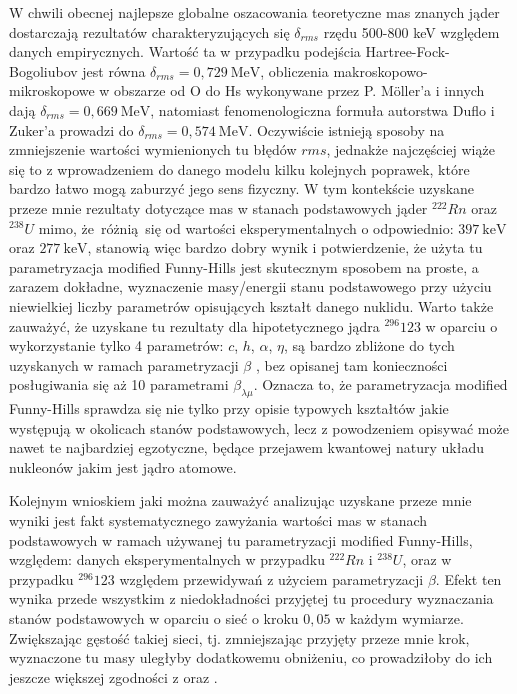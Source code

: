 \documentclass[a4paper,polish,twoside]{article}
\numberwithin{equation}{section}
\begin{document}
W chwili obecnej najlepsze globalne oszacowania teoretyczne mas znanych jąder dostarczają rezultatów charakteryzujących się $\delta_{rms}$ rzędu 500-800 keV względem danych empirycznych. Wartość ta w przypadku podejścia Hartree-Fock-Bogoliubov \cite{Gor1,Gor2} jest równa $\delta_{rms}=0,729~\mathrm{MeV}$, obliczenia makroskopowo-mikroskopowe w obszarze od O do Hs wykonywane przez P. M\"oller'a i innych \cite{Moll2009} dają  $\delta_{rms}=0,669~\mathrm{MeV}$, natomiast fenomenologiczna formuła autorstwa Duflo i Zuker'a \cite{Duflo} prowadzi do $\delta_{rms}=0,574~\mathrm{MeV}$. Oczywiście istnieją sposoby na zmniejszenie wartości wymienionych tu błędów $rms$, jednakże najczęściej wiąże się to z wprowadzeniem do danego modelu kilku kolejnych poprawek, które bardzo łatwo mogą zaburzyć jego sens fizyczny. W tym kontekście uzyskane przeze mnie rezultaty dotyczące mas w stanach podstawowych jąder $^{222}Rn$ oraz $^{238}U$ mimo, \mbox{że różnią się} od wartości eksperymentalnych o odpowiednio: $397~\mathrm{keV}$ oraz $277~\mathrm{keV}$, stanowią więc bardzo dobry wynik i potwierdzenie, że użyta tu parametryzacja modified Funny-Hills jest skutecznym sposobem na proste, a zarazem dokładne, wyznaczenie masy/energii stanu podstawowego przy użyciu niewielkiej liczby parametrów opisujących kształt danego nuklidu. Warto także zauważyć, że uzyskane tu rezultaty dla hipotetycznego jądra  $^{296}123$ w oparciu o wykorzystanie tylko 4 parametrów: $c$, $h$, $\alpha$, $\eta$, są bardzo zbliżone do tych uzyskanych w ramach parametryzacji $\beta$ \cite{A32}, bez opisanej tam konieczności posługiwania się aż 10 parametrami $\beta_{\lambda \mu}$. Oznacza to, że parametryzacja modified Funny-Hills sprawdza się nie tylko przy opisie typowych kształtów jakie występują w okolicach stanów podstawowych, lecz z powodzeniem opisywać może nawet te najbardziej egzotyczne, będące przejawem kwantowej natury układu nukleonów jakim jest jądro atomowe.

Kolejnym wnioskiem jaki można zauważyć analizując uzyskane przeze mnie wyniki jest fakt systematycznego zawyżania wartości mas w stanach podstawowych w ramach używanej tu parametryzacji modified Funny-Hills, względem: danych eksperymentalnych w przypadku $^{222}Rn$ i $^{238}U$, oraz w przypadku $^{296}123$ względem przewidywań z użyciem parametryzacji $\beta$. Efekt ten wynika przede wszystkim z niedokładności przyjętej tu procedury wyznaczania stanów podstawowych w oparciu o sieć o kroku $0,05$ w każdym wymiarze. Zwiększając gęstość takiej sieci, tj. zmniejszając przyjęty przeze mnie krok, wyznaczone tu masy uległyby dodatkowemu obniżeniu, co prowadziłoby do ich jeszcze większej zgodności z \cite{A32} oraz \cite{brookhaven}.
\end{document}
